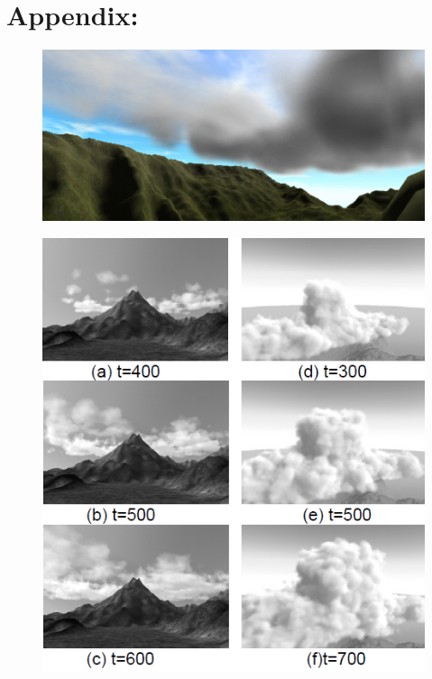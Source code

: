 \clearpage
{}
{}
\addtocounter{section}{1}
\section*{Appendix:}
\begin{figure}[ht!]
	\centering
	\includegraphics[width=\textwidth]{images/Simulation_of_Cloud_Dynamics_on_Graphics_Hardware_2.PNG}
	\caption{\citet{HarrisEtAl03}}
	\label{fig:Simulation_of_Cloud_Dynamics_on_Graphics_Hardware_2}
\end{figure}
\begin{figure}[ht!]
	
	\centering
	\includegraphics[width=\textwidth]{images/A_Method_for_Modeling_Clouds_based_on_Atmospheric_Fluid_Dynamics.PNG}
	\caption{\citet{Miyazaki01}}
	\label{fig:A_Method_for_Modeling_Clouds_based_on_Atmospheric_Fluid_Dynamics}
\end{figure}
